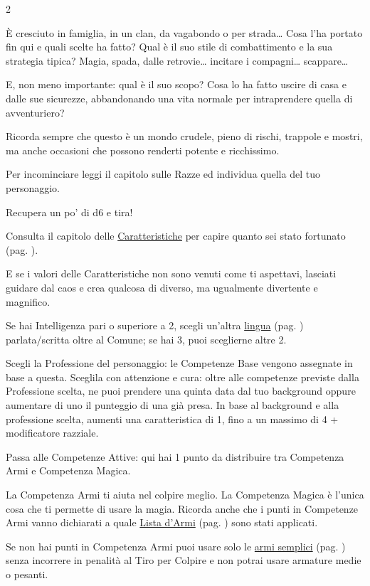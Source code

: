 \begin{multicols}{2}
\smallskip

È cresciuto in famiglia, in un clan, da vagabondo o per strada… Cosa l'ha portato fin qui e quali scelte ha fatto?  Qual è il suo stile di combattimento e la sua strategia tipica? Magia, spada, dalle retrovie… incitare i compagni… scappare…

E, non meno importante: qual è il suo scopo? Cosa lo ha fatto uscire di casa e dalle sue sicurezze, abbandonando una vita normale per intraprendere quella di avventuriero?

Ricorda sempre che questo è un mondo crudele, pieno di rischi, trappole e mostri, ma anche occasioni che possono renderti potente e ricchissimo.

Per incominciare leggi il capitolo sulle Razze ed individua quella del tuo personaggio.

Recupera un po' di d6 e tira!

Consulta il capitolo delle \hyperlink{assegnazione.punteggi.caratteristica}{Caratteristiche} per capire quanto sei stato fortunato (pag. \pageref{assegnazionepunteggicaratteristica}).

E se i valori delle Caratteristiche non sono venuti come ti aspettavi, lasciati guidare dal caos e crea qualcosa di diverso, ma ugualmente divertente e magnifico.

Se hai Intelligenza pari o superiore a 2, scegli un'altra \hyperlink{linguaggi}{lingua} (pag. \pageref{linguaggi}) parlata/scritta oltre al Comune; se hai 3, puoi sceglierne altre 2.

Scegli la Professione del personaggio: le Competenze Base vengono assegnate in base a questa. Sceglila con attenzione e cura: oltre alle competenze previste dalla Professione scelta, ne puoi prendere una quinta data dal tuo background oppure aumentare di uno il punteggio di una già presa.
In base al background e alla professione scelta, aumenti una caratteristica di 1, fino a un massimo di 4 + modificatore razziale.

Passa alle Competenze Attive: qui hai 1 punto da distribuire tra Competenza Armi e Competenza Magica.

La Competenza Armi ti aiuta nel colpire meglio. La Competenza Magica è l'unica cosa che ti permette di usare la magia. Ricorda anche che i punti in Competenze Armi vanno dichiarati a quale \hyperlink{lista.armi}{Lista d'Armi} (pag. \pageref{lista.armi}) sono stati applicati.

Se non hai punti in Competenza Armi puoi usare solo le \hyperlink{armi.semplici}{armi semplici} (pag. \pageref{listaarmisemplice}) senza incorrere in penalità al Tiro per Colpire e non potrai usare armature medie o pesanti.


\end{multicols}
